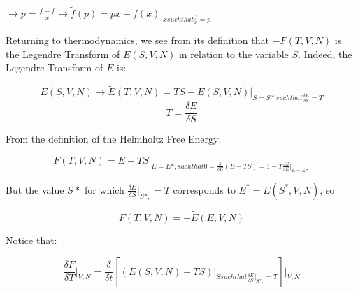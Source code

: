 \documentclass{article}
\newcommand{\pardif}[2]{\frac{\delta#1}{\delta#2}}
\newcommand{\thermdif}[4]{\frac{\delta#1}{\delta#2}\vert_{#3,#4}}
\begin{document}

$\rightarrow p=\frac{f-\tilde{f}}{x}\rightarrow\tilde{f}(p)=px-f(x)\vert_{x such that \frac{f}{x}=p }$

Returning to thermodynamics, we see from its definition that $-F(T,V,N)$ is the Legendre Transform of $E(S,V,N)$ in relation to the variable $S$.  Indeed, the Legendre Transform of $E$ is: 

$$E(S,V,N)\rightarrow\tilde{E}(T,V,N)=TS-E(S,V,N)\vert_{S=S* such that \pardif{E}{S}=T}$$
$$T=\pardif{E}{S}$$

From the definition of the Helmholtz Free Energy:

$$F(T,V,N)=E-TS\vert_{E=E*, such that 0=\frac{\delta}{\delta E}(E-TS)=1-T\pardif{S}{E}\vert_{E=E*}}$$

But the value $S*$ for which $\thermdif{E}{S}{S*}{ }=T$ corresponds to $E^{*}=E(S^{*},V,N)$, so

$$F(T,V,N)=-\tilde{E}(E,V,N)$$

Notice that:

$$\thermdif{F}{T}{V}{N}=\frac{\delta}{\delta t}[(E(S,V,N)-TS)\vert_{S such that \thermdif{E}{S}{S*}{ }=T}]\vert_{V,N}$$

 
     
\end{document}
